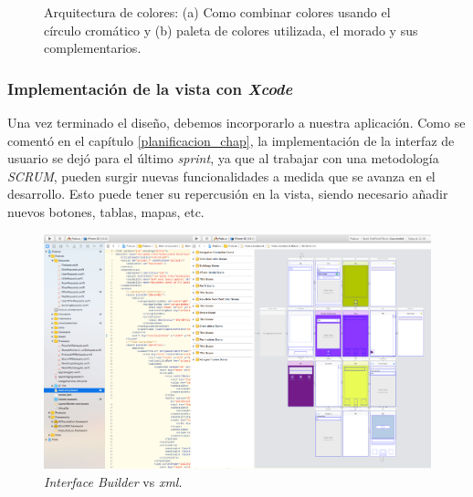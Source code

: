 \begin{figure}[tb]
\centering
{}
\caption{Arquitectura de colores: (a) Como combinar colores usando el círculo cromático y (b) paleta de colores utilizada, el morado y sus complementarios.}
\end{figure}


\subsubsection*{Implementación de la vista con \textit{Xcode}}
Una vez terminado el diseño, debemos incorporarlo a nuestra aplicación. Como se comentó en el capítulo \ref{planificacion_chap}, la implementación de la interfaz de usuario se dejó para el último \textit{sprint}, ya que al trabajar con una metodología \textit{SCRUM}, pueden surgir nuevas funcionalidades a medida que se avanza en el desarrollo. Esto puede tener su repercusión en la vista, siendo necesario añadir nuevos botones, tablas, mapas, etc.

\begin{figure}[tbp]
\centering
\includegraphics[scale=0.2]{figures/story-xml.png}
\caption{\textit{Interface Builder} vs \textit{xml}.\label{fig:story-xml}}
\end{figure}

